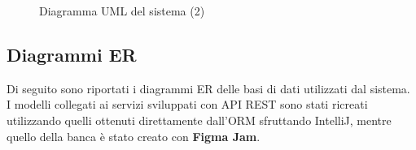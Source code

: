 \documentclass[11pt]{article} %
\begin{document}
\begin{figure}[H]
\begin{center}
\caption{Diagramma UML del sistema (2)}
\end{center}
\end{figure}

\subsection{Diagrammi ER}

Di seguito sono riportati i diagrammi ER delle basi di dati utilizzati dal sistema. I modelli collegati ai servizi sviluppati con API REST sono stati ricreati utilizzando quelli ottenuti direttamente dall'ORM sfruttando IntelliJ, mentre quello della banca è stato creato con \textbf{Figma Jam}.
\end{document}
